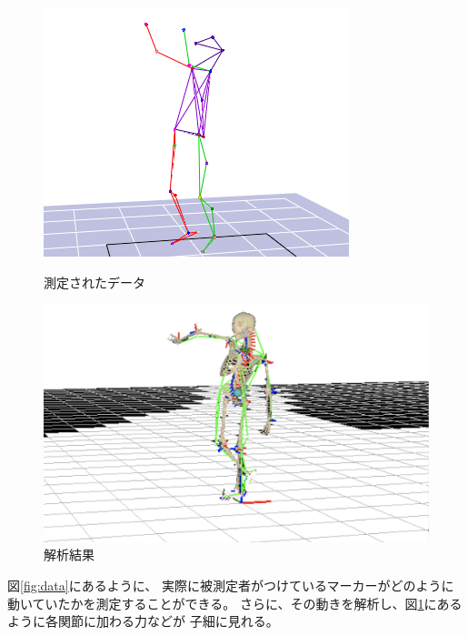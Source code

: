 \documentclass{jsarticle}
\begin{document}
        \begin{figure}[h]
            \begin{minipage}{0.5\hsize}
                \centering
                \includegraphics[width=0.9\hsize]{img/form.png}
                \caption{測定されたデータ}
                \label{fig:data}
            \end{minipage}
            \begin{minipage}{0.5\hsize}
                \centering
                \includegraphics[width=0.9\hsize]{img/spk.png}
                \caption{解析結果}
                \label{fig:anal}
            \end{minipage}
        \end{figure}

        図\ref{fig:data}にあるように、
        実際に被測定者がつけているマーカーがどのように動いていたかを測定することができる。
        さらに、その動きを解析し、図\ref{fig:anal}にあるように各関節に加わる力などが
        子細に見れる。
\end{document}
